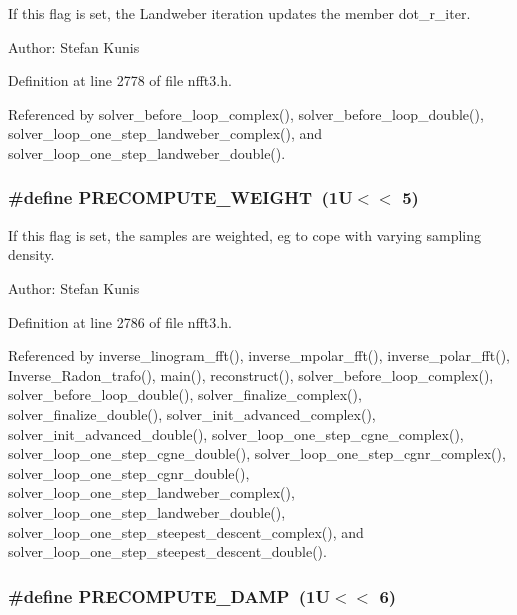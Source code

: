 If this flag is set, the Landweber iteration updates the member dot\_\-r\_\-iter. 

\begin{Desc}
\item[Author:]Stefan Kunis \end{Desc}


Definition at line 2778 of file nfft3.h.

Referenced by solver\_\-before\_\-loop\_\-complex(), solver\_\-before\_\-loop\_\-double(), solver\_\-loop\_\-one\_\-step\_\-landweber\_\-complex(), and solver\_\-loop\_\-one\_\-step\_\-landweber\_\-double().\hypertarget{group__solver_ga59267dba2cd3247c5ee4eb493d31c2d}{
\subsubsection{\setlength{\rightskip}{0pt plus 5cm}\#define PRECOMPUTE\_\-WEIGHT~(1U$<$$<$ 5)}}
\label{group__solver_ga59267dba2cd3247c5ee4eb493d31c2d}


If this flag is set, the samples are weighted, eg to cope with varying sampling density. 

\begin{Desc}
\item[Author:]Stefan Kunis \end{Desc}


Definition at line 2786 of file nfft3.h.

Referenced by inverse\_\-linogram\_\-fft(), inverse\_\-mpolar\_\-fft(), inverse\_\-polar\_\-fft(), Inverse\_\-Radon\_\-trafo(), main(), reconstruct(), solver\_\-before\_\-loop\_\-complex(), solver\_\-before\_\-loop\_\-double(), solver\_\-finalize\_\-complex(), solver\_\-finalize\_\-double(), solver\_\-init\_\-advanced\_\-complex(), solver\_\-init\_\-advanced\_\-double(), solver\_\-loop\_\-one\_\-step\_\-cgne\_\-complex(), solver\_\-loop\_\-one\_\-step\_\-cgne\_\-double(), solver\_\-loop\_\-one\_\-step\_\-cgnr\_\-complex(), solver\_\-loop\_\-one\_\-step\_\-cgnr\_\-double(), solver\_\-loop\_\-one\_\-step\_\-landweber\_\-complex(), solver\_\-loop\_\-one\_\-step\_\-landweber\_\-double(), solver\_\-loop\_\-one\_\-step\_\-steepest\_\-descent\_\-complex(), and solver\_\-loop\_\-one\_\-step\_\-steepest\_\-descent\_\-double().\hypertarget{group__solver_g9ccacd28b2d441a797a5c0d9e6c17fa7}{
\subsubsection{\setlength{\rightskip}{0pt plus 5cm}\#define PRECOMPUTE\_\-DAMP~(1U$<$$<$ 6)}}
\label{group__solver_g9ccacd28b2d441a797a5c0d9e6c17fa7}


